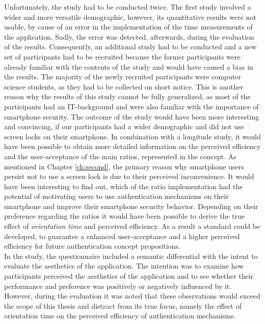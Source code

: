 Unfortunately, the study had to be conducted twice. The first study involved a wider and more versatile demographic, however, its quantitative results were not usable, by cause of an error in the implementation of the time measurements of the application. Sadly, the error was detected, afterwards, during the evaluation of the results. Consequently, an additional study had to be conducted and a new set of participants had to be recruited because the former participants were already familiar with the contents of the study and would have caused a bias in the results. The majority of the newly recruited participants were computer science students, as they had to be collected on short notice. This is another reason why the results of this study cannot be fully generalized, as most of the participants had an IT-background and were also familiar with the importance of smartphone security. The outcome of the study would have been more interesting and convincing, if our participants had a wider demographic and did not use screen locks on their smartphone. In combination with a longitude study, it would have been possible to obtain more detailed information on the perceived efficiency and the user-acceptance of the main ratios, represented in the concept. As mentioned in Chapter \ref{ch:second}, the primary reason why smartphone users persist not to use a screen lock is due to their perceived inconvenience. It would have been interesting to find out, which of the ratio implementation had the potential of motivating users to use authentication mechanisms on their smartphone and improve their smartphone security behavior. Depending on their preference regarding the ratios it would have been possible to derive the true effect of \textit{orientation time} and perceived efficiency. As a result a standard could be developed, to guarantee a enhanced user-acceptance and a higher perceived efficiency for future authentication concept propositions. \\

In the study, the questionnaire included a semantic differential with the intent to evaluate the aesthetics of the application. The intention was to examine how participants perceived the aesthetics of the application and to see whether their performance and preference was positively or negatively influenced by it. However, during the evaluation it was noted that these observations would exceed the scope of this thesis and distract from its true focus, namely the effect of orientation time on the perceived efficiency of authentication mechanisms.\\

